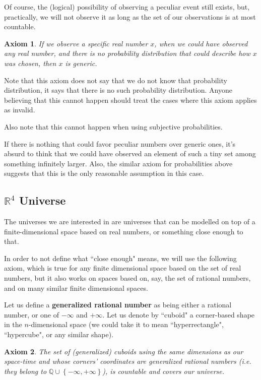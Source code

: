 \documentclass[a4paper
]{article}
\def\reale{\mathbb{R}}
\def\rationale{\mathbb{Q}}
\newcommand{\multime}[1]{\left\{ #1 \right\}}
\newcommand{\definitie}[1]{\textbf{#1}}
\newcommand{\ghilimele}[1]{``#1"}
\newtheorem{axiom}{Axiom}
\begin{document}
Of course, the (logical) possibility of observing a peculiar event still exists,
but, practically, we will not observe it as long as the set of our
observations is at most countable.

\begin{axiom}\label{ax:noprobability}
  If we observe a specific real number $x$, when we could have
  observed any real number, and there is no probability distribution that could
  describe how $x$ was chosen, then $x$ is generic.
\end{axiom}

Note that this axiom does not say that we do not know that probability
distribution, it says that there is no such probability distribution.
Anyone believing that this cannot happen should treat the cases where
this axiom applies as invalid.

Also note that this cannot happen when using subjective probabilities.

If there is nothing that could favor
peculiar numbers over generic ones, it's absurd to think that we could have
observed an element of such a tiny set among something infinitely larger.
Also, the similar axiom for probabilities above suggests that this is the only
reasonable assumption in this case.

\subsection{$\reale^4$ Universe}

The universes we are interested in are universes that can be
modelled on top of a finite-dimensional space based on real numbers,
or something close enough to that.

In order to not define what \ghilimele{close enough} means, we will use
the following axiom, which is true for any finite dimensional space
based on the set of real numbers, but it also works on spaces based on,
say, the set of rational numbers, and on many similar finite dimensional spaces.

Let us define a \definitie{generalized rational number} as being either a
rational number, or one of $-\infty$ and $+\infty$. Let us denote by
\ghilimele{cuboid} a corner-based shape in the $n$-dimensional space
(we could take it to mean \ghilimele{hyperrectangle}, \ghilimele{hypercube},
or any similar shape).

\begin{axiom}\label{ax:rationalcovering}
  The set of (generalized) cuboids using the same dimensions as our space-time
  and whose corners' coordinates are generalized rational numbers (i.e. they
  belong to $\rationale\cup\multime{-\infty, +\infty}$),
  is countable and covers our universe.
\end{axiom}
\end{document}
